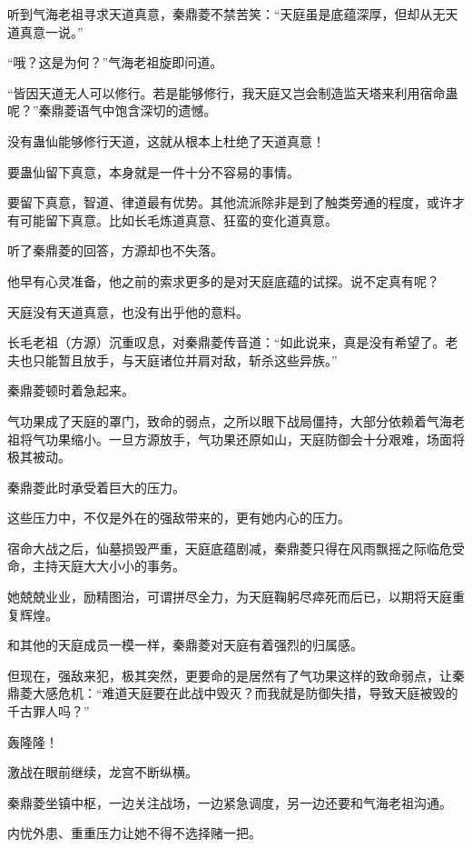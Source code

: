 
\begin{this_body}

听到气海老祖寻求天道真意，秦鼎菱不禁苦笑：“天庭虽是底蕴深厚，但却从无天道真意一说。”

“哦？这是为何？”气海老祖旋即问道。

“皆因天道无人可以修行。若是能够修行，我天庭又岂会制造监天塔来利用宿命蛊呢？”秦鼎菱语气中饱含深切的遗憾。

没有蛊仙能够修行天道，这就从根本上杜绝了天道真意！

要蛊仙留下真意，本身就是一件十分不容易的事情。

要留下真意，智道、律道最有优势。其他流派除非是到了触类旁通的程度，或许才有可能留下真意。比如长毛炼道真意、狂蛮的变化道真意。

听了秦鼎菱的回答，方源却也不失落。

他早有心灵准备，他之前的索求更多的是对天庭底蕴的试探。说不定真有呢？

天庭没有天道真意，也没有出乎他的意料。

长毛老祖（方源）沉重叹息，对秦鼎菱传音道：“如此说来，真是没有希望了。老夫也只能暂且放手，与天庭诸位并肩对敌，斩杀这些异族。”

秦鼎菱顿时着急起来。

气功果成了天庭的罩门，致命的弱点，之所以眼下战局僵持，大部分依赖着气海老祖将气功果缩小。一旦方源放手，气功果还原如山，天庭防御会十分艰难，场面将极其被动。

秦鼎菱此时承受着巨大的压力。

这些压力中，不仅是外在的强敌带来的，更有她内心的压力。

宿命大战之后，仙墓损毁严重，天庭底蕴剧减，秦鼎菱只得在风雨飘摇之际临危受命，主持天庭大大小小的事务。

她兢兢业业，励精图治，可谓拼尽全力，为天庭鞠躬尽瘁死而后已，以期将天庭重复辉煌。

和其他的天庭成员一模一样，秦鼎菱对天庭有着强烈的归属感。

但现在，强敌来犯，极其突然，更要命的是居然有了气功果这样的致命弱点，让秦鼎菱大感危机：“难道天庭要在此战中毁灭？而我就是防御失措，导致天庭被毁的千古罪人吗？”

轰隆隆！

激战在眼前继续，龙宫不断纵横。

秦鼎菱坐镇中枢，一边关注战场，一边紧急调度，另一边还要和气海老祖沟通。

内忧外患、重重压力让她不得不选择赌一把。


\end{this_body}
